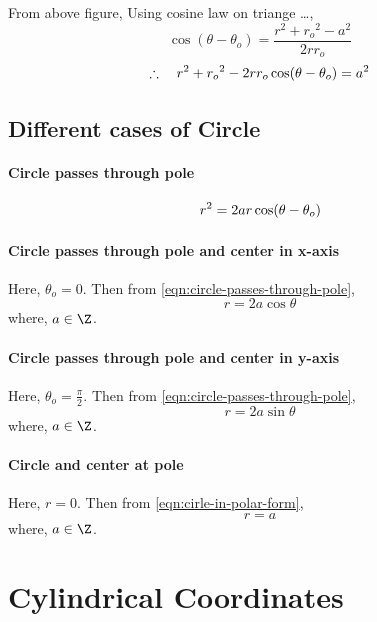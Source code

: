 
From above figure, Using cosine law on triange \ldots,
\[ 
  \cos(\theta-\theta_o) = \frac{r^{2}+{r_o}^2-a^2}{2rr_o}
\]
\begin{equation}
  \label{eqn:cirle-in-polar-form}
  \begin{displaystyle}
    \therefore\quad r^2+{r_o}^2-2rr_o\cos(\theta-\theta_o) = a^2
  \end{displaystyle}
\end{equation}

\subsection{Different cases of Circle}
\label{ssec:different-cases-of-circle}

\paragraph{Circle passes through pole}
\begin{equation}
  \label{eqn:circle-passes-through-pole}
  \begin{displaystyle}
    r^2 = 2ar\cos(\theta-\theta_o)
  \end{displaystyle}
\end{equation}

\paragraph{Circle passes through pole and center in x-axis}
Here, \(\theta_o=0\).
Then from \autoref{eqn:circle-passes-through-pole},
\[ r = 2a\cos\theta \] where, \(a \in \Z\).

\paragraph{Circle passes through pole and center in y-axis}
Here, \(\theta_o=\frac{\pi}{2}\).
Then from \autoref{eqn:circle-passes-through-pole},
\[ r = 2a\sin\theta \] where, \(a \in \Z\).

\paragraph{Circle and center at pole}
Here, \(r=0\).
Then from \autoref{eqn:cirle-in-polar-form},
\[ r = a \] where, \(a \in \Z\).

\section{Cylindrical Coordinates}
\label{sec:cylindrical-coordinates}

